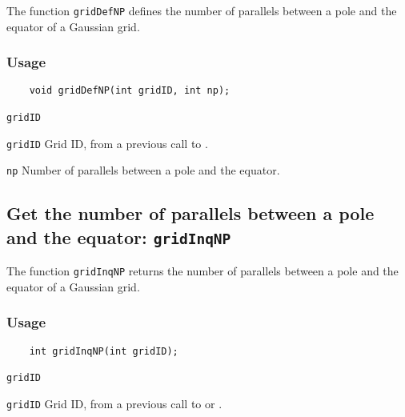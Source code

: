 The function {\texttt{gridDefNP}} defines the number of parallels between a pole and the equator
of a Gaussian grid.

\subsubsection*{Usage}

\begin{verbatim}
    void gridDefNP(int gridID, int np);
\end{verbatim}

\hspace*{4mm}\begin{minipage}[]{15cm}
\begin{deflist}{\texttt{gridID}\ }
\item[\texttt{gridID}]
Grid ID, from a previous call to {}.
\item[\texttt{np}]
Number of parallels between a pole and the equator.

\end{deflist}
\end{minipage}


\subsection{Get the number of parallels between a pole and the equator: \texttt{gridInqNP}}
\label{gridInqNP}

The function {\texttt{gridInqNP}} returns the number of parallels between a pole and the equator
of a Gaussian grid.

\subsubsection*{Usage}

\begin{verbatim}
    int gridInqNP(int gridID);
\end{verbatim}

\hspace*{4mm}\begin{minipage}[]{15cm}
\begin{deflist}{\texttt{gridID}\ }
\item[\texttt{gridID}]
Grid ID, from a previous call to {} or {}.

\end{deflist}
\end{minipage}

